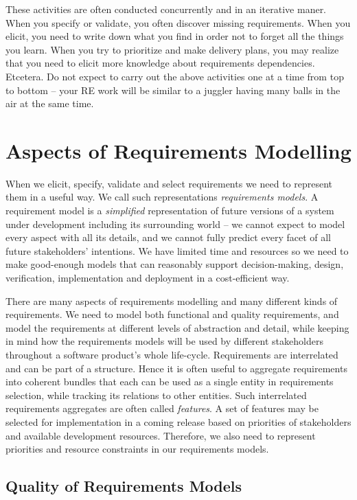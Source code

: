 These activities are often conducted concurrently and in an iterative maner. When you specify or validate, you often discover missing requirements. When you elicit, you need to write down what you find in order not to forget all the things you learn. When you try to prioritize and make delivery plans, you may realize that you need to elicit more knowledge about requirements dependencies. Etcetera. Do not expect to carry out the above activities one at a time from top to bottom -- your RE work will be similar to a juggler having many balls in the air at the same time. 
\section{Aspects of Requirements Modelling}

When we elicit, specify, validate and select requirements we need to represent them in a useful way. We call such representations \textit{requirements models}. A requirement model is a \emph{simplified} representation of future versions of a system under development including its surrounding world -- we cannot expect to model every aspect with all its details, and we cannot fully predict every facet of all future stakeholders' intentions. We have limited time and resources so we need to make good-enough models that can reasonably support decision-making, design, verification, implementation and deployment in a cost-efficient way.

There are many aspects of requirements modelling and many different kinds of requirements. We need to model both functional and quality requirements, and model the requirements at different levels of abstraction and detail, while keeping in mind how the requirements models will be used by different stakeholders throughout a software product's whole life-cycle. Requirements are interrelated and can be part of a structure. Hence it is often useful to aggregate requirements into coherent bundles that each can be used as a single entity in requirements selection, while tracking its relations to other entities. Such interrelated requirements aggregates are often called \emph{features}. A set of features may be selected for implementation in a coming release based on priorities of stakeholders and available development resources. Therefore, we also need to represent priorities and resource constraints in our requirements models.

\subsection{Quality of Requirements Models}

